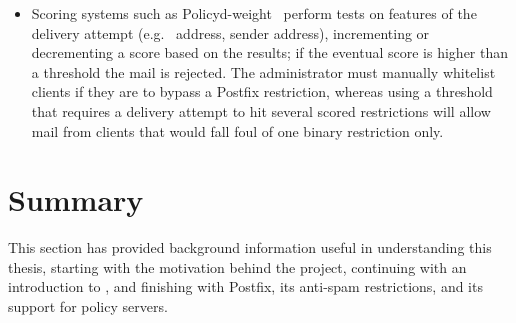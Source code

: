 \begin{itemize}
        \begin{table}[ht]
            \caption{Summary of rejections}\label{Summary of rejections}
            
        \end{table}

    \item Scoring systems such as Policyd-weight~\cite{policyd-weight}
        perform tests on features of the delivery attempt (e.g.\
         address, sender address), incrementing or decrementing
        a score based on the results; if the eventual score is higher than
        a threshold the mail is rejected.  The administrator must manually
        whitelist clients if they are to bypass a Postfix restriction,
        whereas using a threshold that requires a delivery attempt to hit
        several scored restrictions will allow mail from clients that would
        fall foul of one binary restriction only.

\end{itemize}

\section{Summary}

This section has provided background information useful in understanding
this thesis, starting with the motivation behind the project, continuing
with an introduction to \acronym{SMTP}, and finishing with Postfix, its
anti-spam restrictions, and its support for policy servers.
